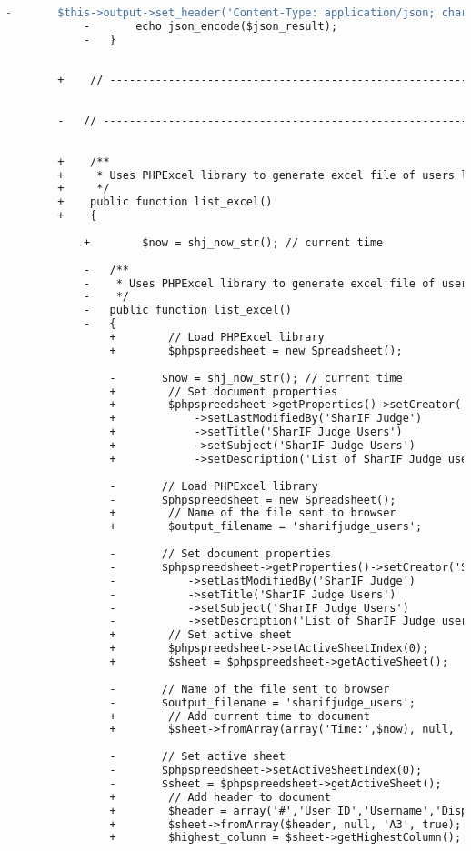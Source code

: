 \begin{lstlisting}[language=diff, caption=Perubahan pada kode Users.php]
			-		$this->output->set_header('Content-Type: application/json; charset=utf-8');
			-		echo json_encode($json_result);
			-	}
		
		
		+    // ------------------------------------------------------------------------
		
		
		-	// ------------------------------------------------------------------------
		
		
		+    /**
		+     * Uses PHPExcel library to generate excel file of users list
		+     */
		+    public function list_excel()
		+    {
			
			+        $now = shj_now_str(); // current time
			
			-	/**
			-	 * Uses PHPExcel library to generate excel file of users list
			-	 */
			-	public function list_excel()
			-	{
				+        // Load PHPExcel library
				+        $phpspreedsheet = new Spreadsheet();
				
				-		$now = shj_now_str(); // current time
				+        // Set document properties
				+        $phpspreedsheet->getProperties()->setCreator('SharIF Judge')
				+            ->setLastModifiedBy('SharIF Judge')
				+            ->setTitle('SharIF Judge Users')
				+            ->setSubject('SharIF Judge Users')
				+            ->setDescription('List of SharIF Judge users ('.$now.')');
				
				-		// Load PHPExcel library
				-		$phpspreedsheet = new Spreadsheet();
				+        // Name of the file sent to browser
				+        $output_filename = 'sharifjudge_users';
				
				-		// Set document properties
				-		$phpspreedsheet->getProperties()->setCreator('SharIF Judge')
				-			->setLastModifiedBy('SharIF Judge')
				-			->setTitle('SharIF Judge Users')
				-			->setSubject('SharIF Judge Users')
				-			->setDescription('List of SharIF Judge users ('.$now.')');
				+        // Set active sheet
				+        $phpspreedsheet->setActiveSheetIndex(0);
				+        $sheet = $phpspreedsheet->getActiveSheet();
				
				-		// Name of the file sent to browser
				-		$output_filename = 'sharifjudge_users';
				+        // Add current time to document
				+        $sheet->fromArray(array('Time:',$now), null, 'A1', true);
				
				-		// Set active sheet
				-		$phpspreedsheet->setActiveSheetIndex(0);
				-		$sheet = $phpspreedsheet->getActiveSheet();
				+        // Add header to document
				+        $header = array('#','User ID','Username','Display Name','Email','Role','First Login','Last Login');
				+        $sheet->fromArray($header, null, 'A3', true);
				+        $highest_column = $sheet->getHighestColumn();
				

\end{lstlisting}
